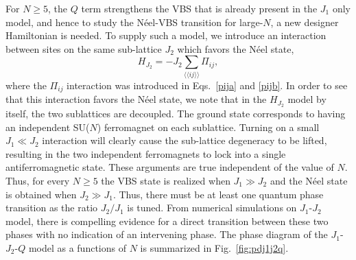 \documentclass[range]{ar2e}
\begin{document}
For $N\geq 5$, the $Q$ term strengthens
the VBS that is already present in the $J_1$ only model, and hence to
study the N\'eel-VBS transition for large-$N$, a new designer
Hamiltonian is needed. To supply such a model, we
introduce an interaction between sites on the same sub-lattice $J_2$ which favors the N\'eel state,
\begin{equation}
H_{J_2}= -J_2 \sum_{\langle\langle ij\rangle\rangle} \Pi_{ij},
\end{equation}
where the $\Pi_{ij}$ interaction was introduced in Eqs.~\ref{pija} and \ref{pijb}.
In order to see that this interaction favors the N\'eel state, we note that in the $H_{J_2}$ model by itself, the two sublattices 
are decoupled. The ground state corresponds to having an independent SU($N$) ferromagnet on each sublattice. Turning on a small $J_1\ll J_2$ 
interaction will clearly cause the sub-lattice degeneracy to be lifted, resulting in the two independent ferromagnets to lock into a single
antiferromagnetic state. These arguments are true independent of the value of $N$. Thus, for every $N\geq 5$ the VBS state is realized when 
$J_1\gg J_2$ and the N\'eel state is obtained when $J_2 \gg J_1$. Thus, there must be at least one quantum phase transition as the ratio
$J_2/J_1$ is tuned. From numerical simulations on $J_1$-$J_2$ model, there is compelling evidence for a direct transition between these two 
phases with no indication of an intervening phase. The phase diagram of the $J_1$-$J_2$-$Q$ model as a functions of $N$ is summarized 
in Fig.~\ref{fig:pdj1j2q}.
\end{document}
